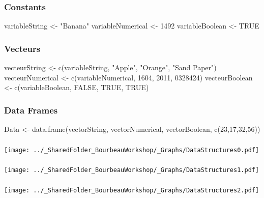 \documentclass{beamer}
\begin{document}
    \begin{frame}[fragile=singleslide]
        \frametitle{Constants}
        \begin{code}
variableString <- "Banana"
variableNumerical <- 1492
variableBoolean <- TRUE
        \end{code}
    \end{frame}
    
    \begin{frame}[fragile=singleslide]
        \frametitle{Vecteurs}
        \begin{code}
vecteurString <- c(variableString, "Apple", "Orange", "Sand Paper")
vecteurNumerical <- c(variableNumerical, 1604, 2011, 0328424)
vecteurBoolean <- c(variableBoolean, FALSE, TRUE, TRUE)
        \end{code}
    \end{frame}
    
    \begin{frame}[fragile=singleslide]
        \frametitle{Data Frames}
        \begin{code}
Data <- data.frame(vectorString, vectorNumerical, vectorBoolean, c(23,17,32,56))
        \end{code}
    \end{frame}

    \begin{frame}
        \frametitle{} \vspace{0.7cm}
        \begin{center}
            \texttt{[image: ../\_SharedFolder\_BourbeauWorkshop/\_Graphs/DataStructures0.pdf]}
        \end{center}
    \end{frame}

    \begin{frame}
        \frametitle{} \vspace{0.7cm}
        \begin{center}
            \texttt{[image: ../\_SharedFolder\_BourbeauWorkshop/\_Graphs/DataStructures1.pdf]}
        \end{center}
    \end{frame}

    \begin{frame}
        \frametitle{} \vspace{0.7cm}
        \begin{center}
            \texttt{[image: ../\_SharedFolder\_BourbeauWorkshop/\_Graphs/DataStructures2.pdf]}
        \end{center}
    \end{frame}
\end{document}
